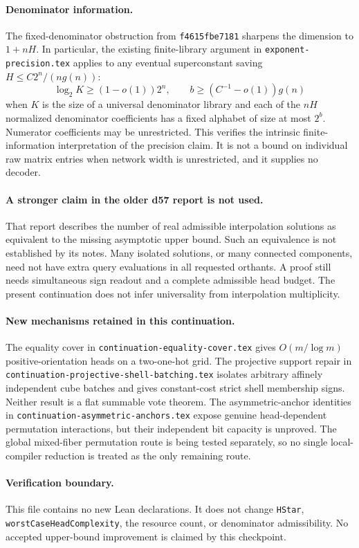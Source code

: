 \documentclass[11pt]{article}
\begin{document}
\paragraph{Denominator information.}
The fixed-denominator obstruction from \texttt{f4615fbe7181} sharpens
the dimension to $1+nH$. In particular, the existing finite-library
argument in \texttt{exponent-precision.tex} applies to any eventual
superconstant saving $H\le C2^n/(ng(n))$:
\[
 \log_2 K\ge (1-o(1))2^n,
 \qquad b\ge (C^{-1}-o(1))g(n)
\]
when $K$ is the size of a universal denominator library and each of the
$nH$ normalized denominator coefficients has a fixed alphabet of size
at most $2^b$. Numerator coefficients may be unrestricted.
This verifies the intrinsic finite-information interpretation of the
precision claim. It is not a bound on individual raw matrix entries
when network width is unrestricted, and it supplies no decoder.

\paragraph{A stronger claim in the older d57 report is not used.}
That report describes the number of real admissible interpolation
solutions as equivalent to the missing asymptotic upper bound. Such an
equivalence is not established by its notes. Many isolated solutions,
or many connected components, need not have extra query evaluations in
all requested orthants. A proof still needs simultaneous sign readout
and a complete admissible head budget. The present continuation does
not infer universality from interpolation multiplicity.

\paragraph{New mechanisms retained in this continuation.}
The equality cover in \texttt{continuation-equality-cover.tex} gives
$O(m/\log m)$ positive-orientation heads on a two-one-hot grid.
The projective support repair in
\texttt{continuation-projective-shell-batching.tex} isolates arbitrary
affinely independent cube batches and gives constant-cost strict shell
membership signs. Neither result is a flat summable vote theorem.
The asymmetric-anchor identities in
\texttt{continuation-asymmetric-anchors.tex} expose genuine
head-dependent permutation interactions, but their independent bit
capacity is unproved. The global mixed-fiber permutation route is being
tested separately, so no single local-compiler reduction is treated as
the only remaining route.

\paragraph{Verification boundary.}
This file contains no new Lean declarations. It does not change
\texttt{HStar}, \texttt{worstCaseHeadComplexity}, the resource count,
or denominator admissibility. No accepted upper-bound improvement is
claimed by this checkpoint.
\end{document}
